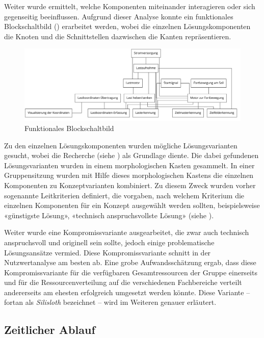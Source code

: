 Weiter wurde ermittelt, welche Komponenten miteinander interagieren oder sich gegenseitig beeinflussen. Aufgrund dieser Analyse konnte ein funktionales Blockschaltbild () erarbeitet werden, wobei die einzelnen Lösungskomponenten die Knoten und die Schnittstellen dazwischen die Kanten repräsentieren.

\begin{figure}
    \includegraphics[width=\linewidth]{graphs/blockschaltbild.png}
    \caption{Funktionales Blockschaltbild}
    \label{fig:blockschaltbild}
\end{figure}

Zu den einzelnen Lösungskomponenten wurden mögliche Lösungsvarianten gesucht, wobei die Recherche (siehe ) als Grundlage diente. Die dabei gefundenen Lösungsvarianten wurden in einem morphologischen Kasten gesammelt. In einer Gruppensitzung wurden mit Hilfe dieses morphologischen Kastens die einzelnen Komponenten zu Konzeptvarianten kombiniert. Zu diesem Zweck wurden vorher sogenannte Leitkriterien definiert, die vorgaben, nach welchem Kriterium die einzelnen Komponenten für ein Konzept ausgewählt werden sollten, beispielsweise «günstigste Lösung», «technisch anspruchsvollste Lösung»  (siehe ).

Weiter wurde eine Kompromissvariante ausgearbeitet, die zwar auch technisch anspruchsvoll und originell sein sollte, jedoch einige problematische Lösungsansätze vermied. Diese Kompromissvariante schnitt in der Nutzwertanalyse am besten ab. Eine grobe Aufwandsschätzung ergab, dass diese Kompromissvariante für die verfügbaren Gesamtressourcen der Gruppe einerseits und für die Ressourcenverteilung auf die verschiedenen Fachbereiche verteilt andererseits am ehesten erfolgreich umgesetzt werden könnte. Diese Variante -- fortan als \textit{Silisloth} bezeichnet -- wird im Weiteren genauer erläutert.

\subsection{Zeitlicher Ablauf}

